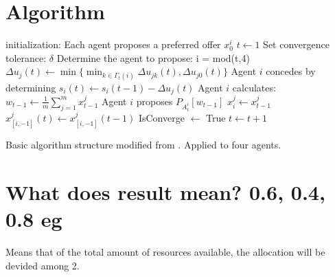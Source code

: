 \section{Algorithm}
\begin{algorithm}[h]
	initialization: Each agent proposes a preferred offer $x^i_0$\;
	$t\leftarrow1$\;
	Set convergence tolerance: $\delta$\;
	{
		Determine the agent to propose: i = mod(t,4)\;
		{
			{
				{
					$\Delta u_j(t)\leftarrow \min \{\min_{k\in\Gamma_t(i)}\Delta u_{jk}(t), \Delta u_{j0}(t)\}$\;	
				}
				Agent $i$ concedes by determining $s_i(t)\leftarrow s_i(t-1)-\Delta u_j(t)$\;
				Agent $i$ calculates: $w_{t-1}\leftarrow \frac{1}{m}\sum_{j=1}^{m}x^j_{t-1}$\;
				Agent $i$ proposes $P_{A^i_t}[w_{t-1}]$\;
			}{
				$x^j_i \leftarrow x^j_{t-1}$\;
				$x^j_{[i,-1]}(t) \leftarrow x^j_{[i,-1]}(t-1)$\;
			}
		}
		{
			IsConverge $\leftarrow $ True\;
		}{
			$t \leftarrow t+1$\;
		}
	}
\caption{Basic algorithm structure modified from \citep{zheng2015automated}. Applied to four agents.}
\end{algorithm}

\section{What does result mean? 0.6, 0.4, 0.8 eg}
Means that of the total amount of resources available, the allocation will be devided among 2. 

